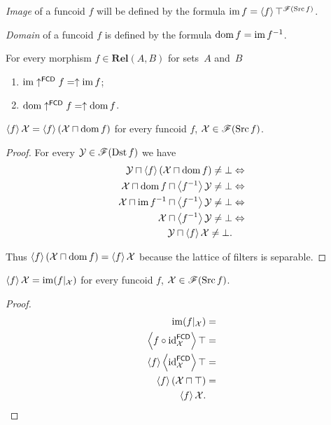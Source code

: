 \begin{defn}
\emph{Image} of a funcoid $f$ will be defined
by the formula $\operatorname{im} f=\left\langle f\right\rangle\top^{\mathscr{F}(\operatorname{Src} f)}$.

\emph{Domain} of a funcoid $f$ is defined
by the formula $\operatorname{dom} f=\operatorname{im} f^{-1}$.\end{defn}
\begin{obvious}
For every morphism $f\in\mathbf{Rel}(A,B)$ for sets~$A$ and~$B$
\begin{enumerate}
\item $\operatorname{im}\uparrow^{\mathsf{FCD}}f=\uparrow\operatorname{im} f$;
\item $\operatorname{dom}\uparrow^{\mathsf{FCD}}f=\uparrow\operatorname{dom} f$.
\end{enumerate}
\end{obvious}
\begin{prop}
$\left\langle f\right\rangle\mathcal{X}=\left\langle f\right\rangle(\mathcal{X}\sqcap\operatorname{dom} f)$ for every
funcoid $f$, $\mathcal{X}\in\mathscr{F}(\operatorname{Src} f)$.\end{prop}
\begin{proof}
For every $\mathcal{Y}\in\mathscr{F}(\operatorname{Dst} f)$ we have
\begin{align*}
\mathcal{Y}\sqcap\left\langle f\right\rangle(\mathcal{X}\sqcap\operatorname{dom} f)\ne\bot
& \Leftrightarrow\\
\mathcal{X}\sqcap\operatorname{dom} f\sqcap\left\langle f^{-1}\right\rangle\mathcal{Y}\ne\bot & \Leftrightarrow\\
\mathcal{X}\sqcap\operatorname{im}
f^{-1}\sqcap\left\langle f^{-1}\right\rangle\mathcal{Y}\ne\bot &
\Leftrightarrow\\
\mathcal{X}\sqcap\left\langle f^{-1}\right\rangle\mathcal{Y}\ne\bot &
\Leftrightarrow\\
\mathcal{Y}\sqcap\left\langle f\right\rangle\mathcal{X}\ne\bot.
\end{align*}


Thus $\left\langle f\right\rangle(\mathcal{X}\sqcap\operatorname{dom} f)=\left\langle f\right\rangle\mathcal{X}$ because
the lattice of filters is separable.\end{proof}
\begin{prop}
$\left\langle f\right\rangle\mathcal{X}=\operatorname{im}(f|_{\mathcal{X}})$ for every funcoid $f$,
$\mathcal{X}\in\mathscr{F}(\operatorname{Src} f)$.\end{prop}
\begin{proof}
~
\begin{align*}
\operatorname{im}(f|_{\mathcal{X}}) & =\\
\left\langle f\circ\operatorname{id}_{\mathcal{X}}^{\mathsf{FCD}}\right\rangle\top & =\\
\left\langle f\right\rangle\left\langle \operatorname{id}_{\mathcal{X}}^{\mathsf{FCD}}\right\rangle\top &
=\\
\left\langle f\right\rangle(\mathcal{X}\sqcap\top) & =\\
\left\langle f\right\rangle\mathcal{X}.
\end{align*}
\end{proof}
